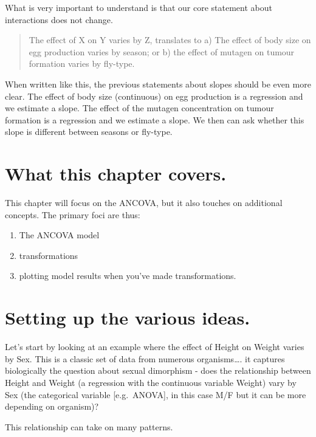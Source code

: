 \documentclass[
]{book}
\providecommand{\tightlist}{%
  \setlength{\itemsep}{0pt}\setlength{\parskip}{0pt}}
\begin{document}
What is very important to understand is that our core statement about interactions does not change.

\begin{quote}
The effect of X on Y varies by Z, translates to a) The effect of body size on egg production varies by season; or b) the effect of mutagen on tumour formation varies by fly-type.
\end{quote}

When written like this, the previous statements about slopes should be even more clear. The effect of body size (continuous) on egg production is a regression and we estimate a slope. The effect of the mutagen concentration on tumour formation is a regression and we estimate a slope. We then can ask whether this slope is different between seasons or fly-type.

\hypertarget{what-this-chapter-covers.}{%
\section{What this chapter covers.}\label{what-this-chapter-covers.}}

This chapter will focus on the ANCOVA, but it also touches on additional concepts. The primary foci are thus:

\begin{enumerate}
\def\labelenumi{\arabic{enumi}.}
\tightlist
\item
  The ANCOVA model
\item
  transformations
\item
  plotting model results when you've made transformations.
\end{enumerate}

\hypertarget{setting-up-the-various-ideas.}{%
\section{Setting up the various ideas.}\label{setting-up-the-various-ideas.}}

Let's start by looking at an example where the effect of Height on Weight varies by Sex. This is a classic set of data from numerous organisms\ldots. it captures biologically the question about sexual dimorphism - does the relationship between Height and Weight (a regression with the continuous variable Weight) vary by Sex (the categorical variable {[}e.g.~ANOVA{]}, in this case M/F but it can be more depending on organism)?

This relationship can take on many patterns.
\end{document}
